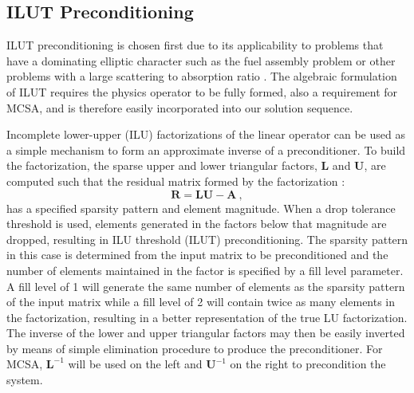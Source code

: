 \subsection{ILUT Preconditioning}
\label{subsec:spn_ilut_preconditioning}
ILUT preconditioning is chosen first due to its applicability to
problems that have a dominating elliptic character such as the fuel
assembly problem or other problems with a large scattering to
absorption ratio \cite{saad_iterative_2003}. The algebraic formulation
of ILUT requires the physics operator to be fully formed, also a
requirement for MCSA, and is therefore easily incorporated into our
solution sequence.

Incomplete lower-upper (ILU) factorizations of the linear operator can
be used as a simple mechanism to form an approximate inverse of a
preconditioner. To build the factorization, the sparse upper and lower
triangular factors, $\mathbf{L}$ and $\mathbf{U}$, are computed such
that the residual matrix formed by the factorization
\cite{saad_iterative_2003}:
\begin{equation}
  \mathbf{R} = \mathbf{L} \mathbf{U} - \mathbf{A} \:,
  \label{eq:ilu_residual_matrix}
\end{equation}
has a specified sparsity pattern and element magnitude. When a drop
tolerance threshold is used, elements generated in the factors below
that magnitude are dropped, resulting in ILU threshold (ILUT)
preconditioning. The sparsity pattern in this case is determined from
the input matrix to be preconditioned and the number of elements
maintained in the factor is specified by a fill level parameter. A
fill level of 1 will generate the same number of elements as the
sparsity pattern of the input matrix while a fill level of 2 will
contain twice as many elements in the factorization, resulting in a
better representation of the true LU factorization. The inverse of the
lower and upper triangular factors may then be easily inverted by
means of simple elimination procedure to produce the
preconditioner. For MCSA, $\mathbf{L}^{-1}$ will be used on the left
and $\mathbf{U}^{-1}$ on the right to precondition the system.

